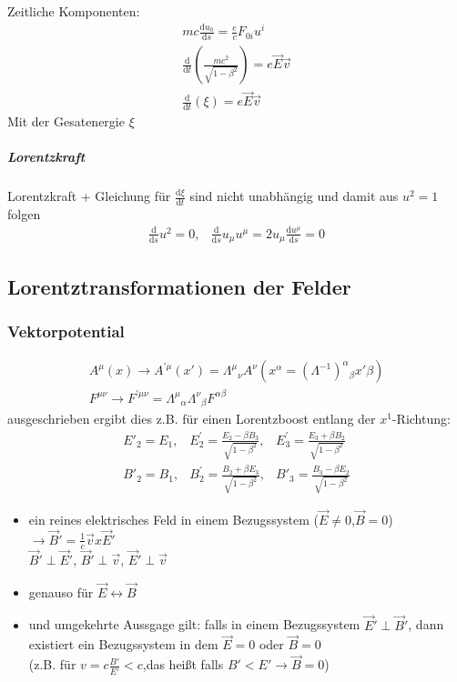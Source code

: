 \documentclass[a4paper]{article}
\begin{document}
Zeitliche Komponenten:
\begin{align}
mc\frac{\mathrm{d}u_0}{\mathrm{d}s}=\frac{e}{c}F_{0i}u^i\\
\frac{\mathrm{d}}{\mathrm{d}t}\left(\frac{mc^2}{\sqrt{1-\beta^2}}\right)=e\vec{E}\vec{v}\\
\frac{\mathrm{d}}{\mathrm{d}t}\left( \xi \right)=e\vec{E}\vec{v}
\end{align}
Mit der Gesatenergie $\xi$
\subparagraph{Lorentzkraft}
Lorentzkraft + Gleichung für $\frac{\mathrm{d}\xi}{\mathrm{d}t}$ sind nicht unabhängig und damit 
aus $u^2=1$ folgen
\begin{align}
\frac{\mathrm{d}}{\mathrm{d}s}u^2=0, & \frac{\mathrm{d}}{\mathrm{d}s}u_\mu u^\mu=2u_\mu\frac{\mathrm{d}u^\mu}{\mathrm{d}s}=0
\end{align}
\subsection{Lorentztransformationen der Felder}
\subsubsection{Vektorpotential}
\begin{align}
A^\mu(x)\rightarrow A^{'\mu}(x')=\Lambda^\mu{}_\nu
A^\nu(x^\alpha=(\Lambda^{-1})^\alpha{}_\beta x{'\beta})\\
F^{\mu\nu}\rightarrow
F^{'\mu\nu}=\Lambda^\mu{}_\alpha \Lambda^\nu{}_\beta F^{\alpha\beta}
\end{align}
ausgeschrieben ergibt dies z.B. für einen Lorentzboost entlang der
$x^1$-Richtung:
\begin{align}
E'_2=E_1 , & E^{'}_2=\frac{E_2-\beta B_3}{\sqrt{1-\beta^2}} , &
E^{'}_3=\frac{E_3+\beta B_2}{\sqrt{1-\beta^2}}\\
B'_2=B_1 , & B^{'}_2=\frac{B_2+\beta E_3}{\sqrt{1-\beta^2}} , &
B'_3=\frac{B_3-\beta E_2}{\sqrt{1-\beta^2}}
\end{align}
\begin{itemize}
  \item ein reines elektrisches Feld in einem Bezugssystem
  ($\vec{E}\neq0$,$\vec{B}=0$)\\ $\rightarrow
  \vec{B}'=\frac{1}{c}\vec{v}x\vec{E}'$ \\ $\vec{B}'\perp \vec{E}'$,
  $\vec{B}'\perp \vec{v}$, $\vec{E}'\perp \vec{v}$
  \item genauso für $\vec{E}\leftrightarrow\vec{B}$
  \item und umgekehrte Aussgage gilt: falls in einem Bezugssystem
  $\vec{E}'\perp\vec{B}'$, dann existiert ein Bezugssystem in dem $\vec{E}=0$
  oder $\vec{B}=0$\\ (z.B. für $v=c\frac{B'}{E'}<c$,das heißt falls
  $B'<E'\rightarrow\vec{B}=0$)
\end{itemize}
\end{document}
